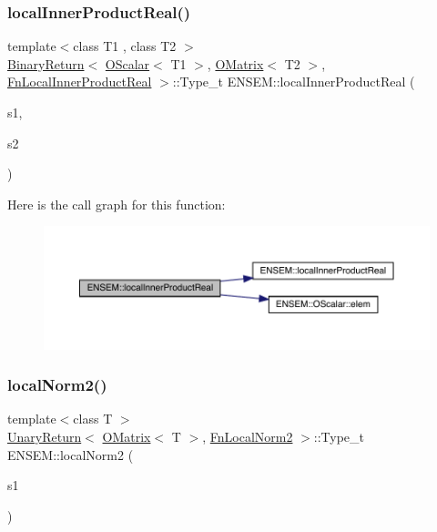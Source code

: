 \subsubsection{\texorpdfstring{localInnerProductReal()}{localInnerProductReal()}\hspace{0.1cm}{\footnotesize\ttfamily [3/3]}}
{\footnotesize\ttfamily template$<$class T1 , class T2 $>$ \\
\mbox{\hyperlink{structENSEM_1_1BinaryReturn}{Binary\+Return}}$<$ \mbox{\hyperlink{classENSEM_1_1OScalar}{O\+Scalar}}$<$ T1 $>$, \mbox{\hyperlink{classENSEM_1_1OMatrix}{O\+Matrix}}$<$ T2 $>$, \mbox{\hyperlink{structENSEM_1_1FnLocalInnerProductReal}{Fn\+Local\+Inner\+Product\+Real}} $>$\+::Type\+\_\+t E\+N\+S\+E\+M\+::local\+Inner\+Product\+Real (\begin{DoxyParamCaption}\item[{const \mbox{\hyperlink{classENSEM_1_1OScalar}{O\+Scalar}}$<$ T1 $>$ \&}]{s1,  }\item[{const \mbox{\hyperlink{classENSEM_1_1OMatrix}{O\+Matrix}}$<$ T2 $>$ \&}]{s2 }\end{DoxyParamCaption})\hspace{0.3cm}{\ttfamily [inline]}}

Here is the call graph for this function\+:\nopagebreak
\begin{figure}[H]
\begin{center}
\leavevmode
\includegraphics[width=350pt]{d8/d55/group__obsmatrix_gad83f3516610f8446eb55b7e511c807be_cgraph}
\end{center}
\end{figure}
\mbox{\label{group__obsmatrix_ga13d075f8a50ffa95c7a8a7fa61fe8028}} 
\subsubsection{\texorpdfstring{localNorm2()}{localNorm2()}}
{\footnotesize\ttfamily template$<$class T $>$ \\
\mbox{\hyperlink{structENSEM_1_1UnaryReturn}{Unary\+Return}}$<$ \mbox{\hyperlink{classENSEM_1_1OMatrix}{O\+Matrix}}$<$ T $>$, \mbox{\hyperlink{structENSEM_1_1FnLocalNorm2}{Fn\+Local\+Norm2}} $>$\+::Type\+\_\+t E\+N\+S\+E\+M\+::local\+Norm2 (\begin{DoxyParamCaption}\item[{const \mbox{\hyperlink{classENSEM_1_1OMatrix}{O\+Matrix}}$<$ T $>$ \&}]{s1 }\end{DoxyParamCaption})\hspace{0.3cm}{\ttfamily [inline]}}

